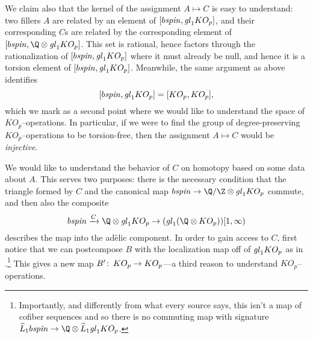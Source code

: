 We claim also that the kernel of the assignment \(A \mapsto C\) is easy to understand: two fillers \(A\) are related by an element of \([b\mathit{spin}, \mathit{gl}_1 KO_p]\), and their corresponding \(C\)s are related by the corresponding element of \([b\spin, \Q \otimes \gl_1 KO_p]\).  This set is rational, hence factors through the rationalization of \([b\mathit{spin}, \mathit{gl}_1 KO_p]\) where it must already be null, and hence it is a torsion element of \([b\mathit{spin}, \mathit{gl}_1 KO_p]\).  Meanwhile, the same argument as above identifies \[[b\mathit{spin}, \mathit{gl}_1 KO_p] = [KO_p, KO_p],\] which we mark as a second point where we would like to understand the space of \(KO_p\)--operations.  In particular, if we were to find the group of degree-preserving \(KO_p\)--operations to be torsion-free, then the assignment \(A \mapsto C\) would be \emph{injective}.

We would like to understand the behavior of \(C\) on homotopy based on some data about \(A\).  This serves two purposes: there is the necessary condition that the triangle formed by \(C\) and the canonical map \(b\spin \to \Q / \Z \otimes \gl_1 KO_p\) commute, and then also the composite \[b\spin \xrightarrow{C} \Q \otimes \gl_1 KO_p \to (\gl_1 (\Q \otimes KO_p))[1, \infty)\] describes the map into the ad\`elic component.  In order to gain access to \(C\), first notice that we can postcompose \(B\) with the localization map off of \(\mathit{gl}_1 KO_p\) as in .\footnote{Importantly, and differently from what every source says, this isn't a map of cofiber sequences and so there is no commuting map with signature \(\widehat L_1 b\spin \to \Q \otimes \widehat L_1 \gl_1 KO_p\).}  This gives a new map \(B'\colon\thinspace KO_p \to KO_p\)---a third reason to understand \(KO_p\)--operations.

